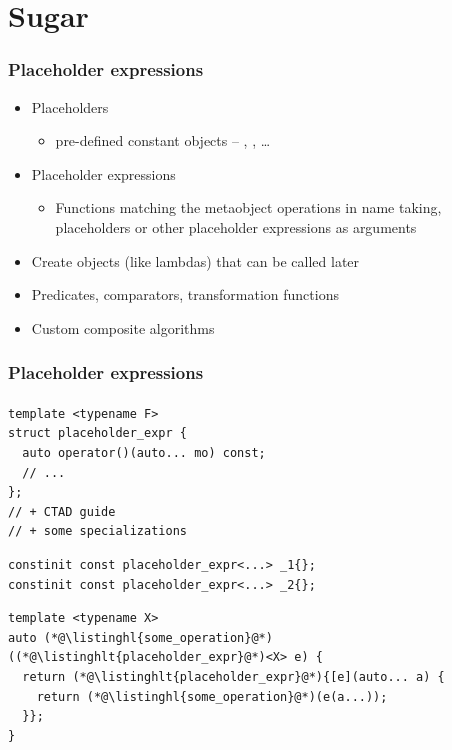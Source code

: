 \documentclass[compress,table,xcolor=table]{beamer}
\begin{document}
\section{Sugar}
\begin{frame}
  \frametitle{Placeholder expressions}
  \larger
  \begin{itemize}
    \item Placeholders
    \begin{itemize}
      \item pre-defined constant objects -- , , \ldots
    \end{itemize}
    \item Placeholder expressions
    \begin{itemize}
      \item Functions matching the metaobject operations in name taking,
        placeholders or other placeholder expressions as arguments
    \end{itemize}
    \item Create objects (like lambdas) that can be called later
    \item Predicates, comparators, transformation functions
    \item Custom composite algorithms
  \end{itemize}
\end{frame}
\begin{frame}[fragile]
  \frametitle{Placeholder expressions}
  \framesubtitle{}
  \begin{lstlisting}[language=c++2x,basicstyle=\small\ttfamily]
template <typename F>
struct placeholder_expr {
  auto operator()(auto... mo) const;
  // ...
};
// + CTAD guide
// + some specializations
  \end{lstlisting}
  \vfill
  \begin{lstlisting}[language=c++2x,basicstyle=\small\ttfamily]
constinit const placeholder_expr<...> _1{};
constinit const placeholder_expr<...> _2{};
  \end{lstlisting}
  \vfill
  \begin{lstlisting}[language=c++2x,basicstyle=\small\ttfamily]
template <typename X>
auto (*@\listinghl{some_operation}@*)((*@\listinghlt{placeholder_expr}@*)<X> e) {
  return (*@\listinghlt{placeholder_expr}@*){[e](auto... a) {
    return (*@\listinghl{some_operation}@*)(e(a...));
  }};
}
  \end{lstlisting}
\end{frame}
\end{document}
